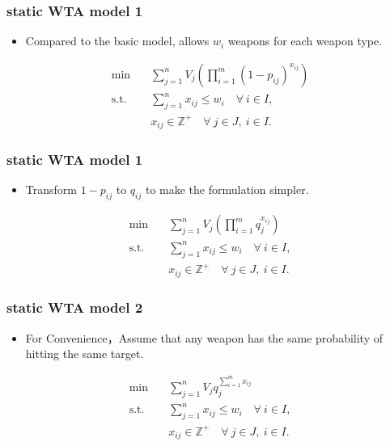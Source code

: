 \documentclass[CJK,10pt]{beamer}
\begin{document}
\begin{frame}
    \frametitle{static WTA model 1}
    \begin{itemize}
        \item Compared to the basic model, allows $w_i$ weapons for each weapon type.
    \end{itemize}
    \begin{align*} \tag{S1.1}
        \min\quad & \sum_{j=1}^n V_j \left( \prod_{i=1}^m (1 -  p_{ij})^{x_{ij}} \right) \\ 
        \mathrm{s. t.}\quad &\sum_{j=1}^n x_{ij} \leq w_i\quad \forall ~i \in I,\\
        & x_{ij} \in \mathbb{Z}^+ \quad \forall~ j\in J , ~ i \in I.
    \end{align*}
    
\end{frame}
\begin{frame}
    \frametitle{static WTA model 1}
    \begin{itemize}
        \item Transform $1-p_{ij}$ to $q_{ij}$ to make the formulation simpler.
    \end{itemize}
    \begin{align*} \tag{S1.2}
        \min\quad & \sum_{j=1}^n V_j \left( \prod_{i=1}^m q_j^{x_{ij}} \right) \\ 
        \mathrm{s. t.}\quad &\sum_{j=1}^n x_{ij} \leq w_i\quad \forall ~i \in I,\\
        & x_{ij} \in \mathbb{Z}^+ \quad \forall~ j\in J , ~ i \in I.
    \end{align*}
\end{frame}

\begin{frame}
    \frametitle{static WTA model 2}
    \begin{itemize}
        \item For Convenience，Assume that any weapon has the same probability of  hitting the same target.
    \end{itemize}
    \begin{align*} \tag{S2}
        \min\quad & \sum_{j=1}^n V_j q_j^{\sum_{i=1}^m x_{ij}} \\ 
        \mathrm{s. t.}\quad &\sum_{j=1}^n x_{ij} \leq w_i\quad \forall ~i \in I,\\
        & x_{ij} \in \mathbb{Z}^+ \quad \forall~ j\in J , ~ i \in I.
    \end{align*}
\end{frame}
\end{document}
